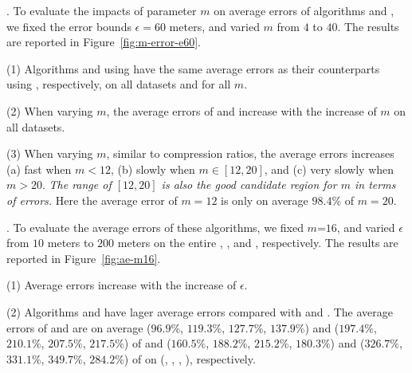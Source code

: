 .
To evaluate the impacts of parameter $m$ on average errors of algorithms \cist and \cista, we fixed the error bounds {$\epsilon =60$ meters}, and varied $m$ from $4$ to $40$. The results are reported in Figure~\ref{fig:m-error-e60}.



\ni(1) Algorithms \cist and \cista using \rpia have the same average errors as their counterparts using \cpia, respectively, on all datasets and for all $m$.

\ni(2) When varying $m$, the average errors of \cist and \cista increase with the increase of $m$ on all datasets.

\ni(3) When varying $m$, similar to compression ratios, the average errors increases (a) fast when $m < 12$, (b) slowly when $m \in [12, 20]$, and (c) very slowly when $m > 20$. \emph{The range of $[12, 20]$ is also the good candidate region for $m$ in terms of errors.} Here the average error of $m=12$ is only on average {$98.4\%$} of $m=20$.




.
To evaluate the average errors of these algorithms, we fixed {$m$=$16$}, and varied $\epsilon$ from $10$ meters to $200$ meters on the entire \truck, \sercar, \geolife and \pricar, respectively.
The results are reported in Figure~\ref{fig:ae-m16}.

\ni(1) Average errors increase with the increase of $\epsilon$.

\ni(2) Algorithms \cist and \cista have lager average errors compared with \dps and \squishe.
The average errors of \cist and \cista are on average ($96.9\%$, $119.3\%$, $127.7\%$, $137.9\%$) and ($197.4\%$, $210.1\%$, $207.5\%$, $217.5\%$) of \dps and ($160.5\%$, $188.2\%$, $215.2\%$, {$180.3\%$}) and ($326.7\%$, $331.1\%$, $349.7\%$, {$284.2\%$}) of \squishe on (\truck, \sercar, \geolife, \pricar), respectively.

